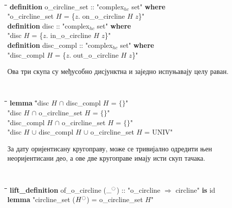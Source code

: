 {\tt
\begin{tabbing}
\hspace{5mm}\=\hspace{5mm}\=\hspace{5mm}\=\hspace{5mm}\=\hspace{5mm}\=\kill
\textbf{definition} o\_circline\_set :: "complex$_{hc}$ set" \textbf{where} \\
\>"o\_circline\_set $H$ = \{$z$. on\_o\_circline $H$ $z$\}"\\
\textbf{definition} disc :: "complex$_{hc}$ set" \textbf{where} \\
\>"disc $H$ = \{$z$. in\_o\_circline $H$ $z$\}"\\
\textbf{definition} disc\_compl :: "complex$_{hc}$ set" \textbf{where} \\
\>"disc\_compl $H$ = \{$z$. out\_o\_circline $H$ $z$\}"
\end{tabbing}
}

Ова три скупа су међусобно дисјунктна и заједно испуњавају целу раван.
{\tt
\begin{tabbing}
\hspace{5mm}\=\hspace{5mm}\=\hspace{5mm}\=\hspace{5mm}\=\hspace{5mm}\=\kill
\textbf{lemma} \="disc $H$ $\cap$ disc\_compl $H$ = $\{\}$" \\
\>"disc $H$ $\cap$ o\_circline\_set $H$ = $\{\}$"\\
\>"disc\_compl $H$ $\cap$ o\_circline\_set $H$ = $\{\}$"\\
\>"disc $H$ $\cup$ disc\_compl $H$ $\cup$ o\_circline\_set $H$ = UNIV"
\end{tabbing}
}

За дату оријентисану кругоправу, може се тривијално одредити њен
неоријентисани део, а ове две кругоправе имају исти скуп тачака.
{\tt
  \begin{tabbing}
    \hspace{5mm}\=\hspace{5mm}\=\hspace{5mm}\=\hspace{5mm}\=\hspace{5mm}\=\kill
\textbf{lift\_definition} of\_o\_circline (${\_}^{\ocircle}$) :: "o\_circline $\Rightarrow$ circline" \textbf{is} id \\
\textbf{lemma} "circline\_set (${H}^{\ocircle}$) = o\_circline\_set $H$"
  \end{tabbing}
}


